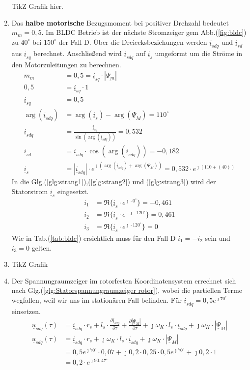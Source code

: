 \begin{solution}
\begin{enumerate}
TikZ Grafik hier.
\item Das \textbf{halbe motorische} Bezugsmoment bei positiver Drehzahl bedeutet $m_m = 0,5$. Im BLDC Betrieb ist der n\"achste Stromzeiger gem Abb.(\ref{fig:bldc}) zu $40^\circ$ bei $150^\circ$ der Fall D. \"Uber die Dreiecksbeziehungen werden $\underline{i}_{sdq}$ und $\underline{i}_{sd}$ aus $\underline{i}_{sq}$ berechnet. Anschließend wird $\underline{i}_{sdq}$ auf $\underline{i}_{s}$ umgeformt um die Str\"ome in den Motorzuleitungen zu berechnen.
\begin{align}
m_m &= 0,5 = \underline{i}_{sq} \cdot |\underline{\Psi_m}|\\
0,5 &= \underline{i}_{sq} \cdot 1\\
\underline{i}_{sq} &= 0,5\\
\arg(\underline{i}_{sdq}) &= \arg(\underline{i}_{s}) -\arg(\underline{\Psi}_{M})=110^\circ\\
\underline{i}_{sdq} &= \frac{\underline{i}_{sq}}{\sin(\arg(\underline{i}_{sdq}))}= 0,532\\
\underline{i}_{sd} &= \underline{i}_{sdq} \cdot \cos(\arg(\underline{i}_{sdq})) = -0,182\\
\underline{i}_{s} &= |\underline{i}_{sdq}| \cdot e^{\jmath (\arg(\underline{i}_{sdq}) + \arg(\underline{\Psi}_{M}))}= 0,532 \cdot e^{\jmath ( 110 + (40))}
\end{align}
In die Glg.(\ref{glg:strang1}),(\ref{glg:strang2}) und (\ref{glg:strang3}) wird der Statorstrom $\underline{i}_s$ eingesetzt.
\begin{align}
i_1 & = \Re \{ \underline{i}_s \cdot e^{\jmath \cdot 0 ^\circ} \} = -0,461\\
i_2 & = \Re \{ \underline{i}_s \cdot e^{-\jmath \cdot 120 ^\circ} \} = 0,461 \\
i_3 & = \Re \{ \underline{i}_s \cdot e^{\jmath \cdot 120 ^\circ} \}=  0
\end{align}
Wie in Tab.(\ref{tab:bldc}) ersichtlich muss f\"ur den Fall D $i_1= -i_2$ sein und $i_3= 0$ gelten.
\item TikZ Grafik
\item Der Spannungraumzeiger im rotorfesten Koordinatensystem errechnet sich nach Glg.(\ref{glg:Statorspannungraumzeiger rotor}), wobei die partiellen Terme wegfallen, weil wir uns im station\"aren Fall befinden. F\"ur $\underline{i}_{sdq}= 0,5 e^{\jmath 70^\circ}$ einsetzen.
\begin{align}
\underline{u}_{sdq}(\tau) &= \underline{i}_{sdq} \cdot r_s + l_s \cdot \frac{\partial \underline{i}_{sdq}}{\partial \tau} + \frac{\partial |\underline{\Psi}_M|}{\partial \tau} + \jmath \omega_K \cdot l_s \cdot \underline{i}_{sdq} + \jmath \omega_K \cdot |\underline{\Psi}_M|\\
\underline{u}_{sdq}(\tau) &= \underline{i}_{sdq} \cdot r_s + \jmath \omega_K \cdot l_s \cdot \underline{i}_{sdq} + \jmath \omega_K \cdot |\underline{\Psi}_M|\\
&= 0,5 e^{\jmath 70^\circ} \cdot 0,07 + \jmath 0,2 \cdot 0,25 \cdot 0,5 e^{\jmath 70^\circ}+\jmath 0,2 \cdot 1\\
&=0,2 \cdot e^{\jmath 90,47^\circ}
\end{align}
\end{enumerate}
\end{solution}